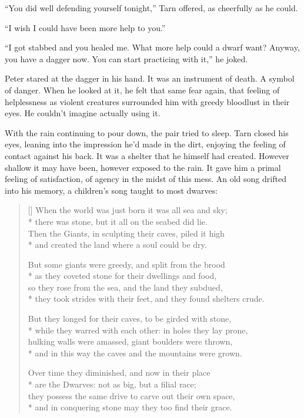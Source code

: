 ``You did well defending yourself tonight,'' Tarn offered, as cheerfully as he could.

``I wish I could have been more help to you.''

``I got stabbed and you healed me.  What more help could a dwarf want?  Anyway, you have a dagger now.  You can start practicing with it,'' he joked.

Peter stared at the dagger in his hand.  It was an instrument of death.  A symbol of danger.  When he looked at it, he felt that same fear again, that feeling of helplessness as violent creatures surrounded him with greedy bloodlust in their eyes.  He couldn't imagine actually using it.

With the rain continuing to pour down, the pair tried to sleep.  Tarn closed his eyes, leaning into the impression he'd made in the dirt, enjoying the feeling of contact against his back.  It was a shelter that he himself had created.  However shallow it may have been, however exposed to the rain.  It gave him a primal feeling of satisfaction, of agency in the midst of this mess.  An old song drifted into his memory, a children's song taught to most dwarves:

\settowidth{\versewidth}{When the world was just born it was all sea and sky;}
\begin{verse}[\versewidth]
When the world was just born it was all sea and sky;\\*
there was stone, but it all on the seabed did lie.\\
Then the Giants, in sculpting their caves, piled it high\\*
and created the land where a soul could be dry.

But some giants were greedy, and split from the brood\\*
as they coveted stone for their dwellings and food,\\
so they rose from the sea, and the land they subdued,\\*
they took strides with their feet, and they found shelters crude.

But they longed for their caves, to be girded with stone,\\*
while they warred with each other: in holes they lay prone,\\
hulking walls were amassed, giant boulders were thrown,\\*
and in this way the caves and the mountains were grown.

Over time they diminished, and now in their place\\*
are the Dwarves: not as big, but a filial race;\\
they possess the same drive to carve out their own space,\\*
and in conquering stone may they too find their grace.
\end{verse}

